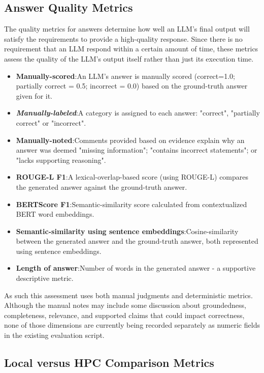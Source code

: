 \subsection{Answer Quality Metrics}

The quality metrics for answers determine how well an LLM's final output will satisfy the requirements to provide a high-quality response. Since there is no requirement that an LLM respond within a certain amount of time, these metrics assess the quality of the LLM's output itself rather than just its execution time.

\begin{itemize}
    \item {\textbf{Manually-scored}}:\quad An LLM's answer is manually scored (correct=1.0; partially correct = 0.5; incorrect = 0.0) based on the ground-truth answer given for it.
    \item \textit{\textbf{Manually-labeled}}:\quad A category is assigned to each answer: "correct", "partially correct" or "incorrect".
    \item {\textbf{Manually-noted}}:\quad Comments provided based on evidence explain why an answer was deemed "missing information"; "contains incorrect statements"; or "lacks supporting reasoning".
    \item {\textbf{ROUGE-L F1}}:\quad A lexical-overlap-based score (using \ac{ROUGE-L}) compares the generated answer against the ground-truth answer.
    \item {\textbf{BERTScore F1}}:\quad Semantic-similarity score calculated from contextualized BERT word embeddings.
    \item {\textbf{Semantic-similarity using sentence embeddings}}:\quad Cosine-similarity between the generated answer and the ground-truth answer, both represented using sentence embeddings.
    \item {\textbf{Length of answer}}:\quad Number of words in the generated answer - a supportive descriptive metric.
\end{itemize}

As such this assessment uses both manual judgments and deterministic metrics. Although the manual notes may include some discussion about groundedness, completeness, relevance, and supported claims that could impact correctness, none of those dimensions are currently being recorded separately as numeric fields in the existing evaluation script.

\subsection{Local versus HPC Comparison Metrics}

